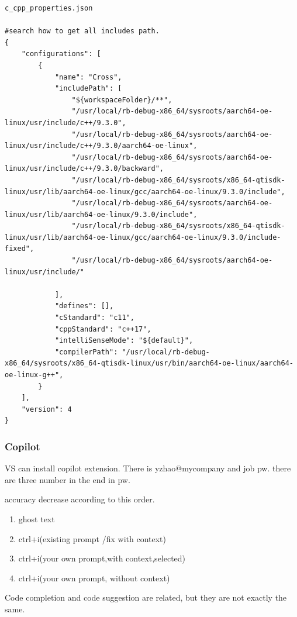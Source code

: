 \documentclass[paper=8.5in:11in, twoside, 12pt, pagesize=pdftex]{book}
\begin{document}
\begin{lstlisting}
c_cpp_properties.json

#search how to get all includes path.
{
    "configurations": [
        {
            "name": "Cross",
            "includePath": [
                "${workspaceFolder}/**",
                "/usr/local/rb-debug-x86_64/sysroots/aarch64-oe-linux/usr/include/c++/9.3.0",
                "/usr/local/rb-debug-x86_64/sysroots/aarch64-oe-linux/usr/include/c++/9.3.0/aarch64-oe-linux",
                "/usr/local/rb-debug-x86_64/sysroots/aarch64-oe-linux/usr/include/c++/9.3.0/backward",
                "/usr/local/rb-debug-x86_64/sysroots/x86_64-qtisdk-linux/usr/lib/aarch64-oe-linux/gcc/aarch64-oe-linux/9.3.0/include",
                "/usr/local/rb-debug-x86_64/sysroots/aarch64-oe-linux/usr/lib/aarch64-oe-linux/9.3.0/include",
                "/usr/local/rb-debug-x86_64/sysroots/x86_64-qtisdk-linux/usr/lib/aarch64-oe-linux/gcc/aarch64-oe-linux/9.3.0/include-fixed",
                "/usr/local/rb-debug-x86_64/sysroots/aarch64-oe-linux/usr/include/"

            ],
            "defines": [],
            "cStandard": "c11",
            "cppStandard": "c++17",
            "intelliSenseMode": "${default}",
            "compilerPath": "/usr/local/rb-debug-x86_64/sysroots/x86_64-qtisdk-linux/usr/bin/aarch64-oe-linux/aarch64-oe-linux-g++",
        }
    ],
    "version": 4
}
\end{lstlisting}


\subsubsection{Copilot}
VS can install copilot extension. There is yzhao@mycompany and job pw. there are three number in the end in pw.

accuracy decrease according to this order. 
\begin{enumerate}
	\item ghost text
	
	\item  ctrl+i(existing prompt /fix with context) 
	
	\item  ctrl+i(your own prompt,with context,selected)
	
	\item ctrl+i(your own prompt, without context) 
\end{enumerate} 

Code completion and code suggestion are related, but they are not exactly the same. 
\end{document}
